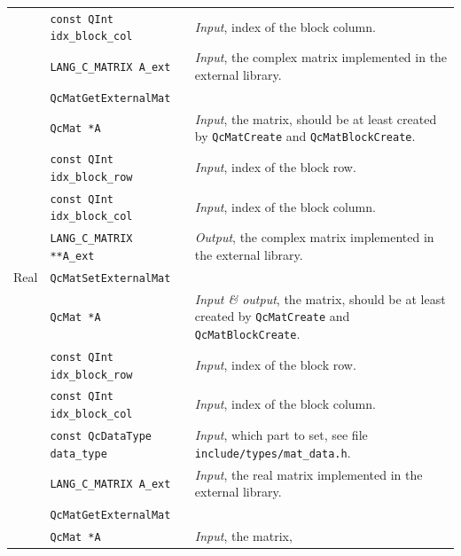 \documentclass[a4paper,11pt,twoside,openright]{book}
\begin{document}
\begin{center}
\begin{longtable}{p{}|l|p{}}
    & \hspace*{2ex}\verb|const QInt idx_block_col| & \textsl{Input},
      index of the block column.\\
    & \hspace*{2ex}\verb|LANG_C_MATRIX A_ext| & \textsl{Input}, the complex
      matrix implemented in the external library.\\
    \cline{2-3}
    & \verb|QcMatGetExternalMat| &\\
    & \hspace*{2ex}\verb|QcMat *A| & \textsl{Input}, the matrix,
      should be at least created by \verb|QcMatCreate| and \verb|QcMatBlockCreate|.\\
    & \hspace*{2ex}\verb|const QInt idx_block_row| & \textsl{Input},
      index of the block row.\\
    & \hspace*{2ex}\verb|const QInt idx_block_col| & \textsl{Input},
      index of the block column.\\
    & \hspace*{2ex}\verb|LANG_C_MATRIX **A_ext| & \textsl{Output}, the complex
      matrix implemented in the external library.\\
    \hline
    Real & \verb|QcMatSetExternalMat| &\\
    & \hspace*{2ex}\verb|QcMat *A| & \textsl{Input \& output}, the matrix,
      should be at least created by \verb|QcMatCreate| and \verb|QcMatBlockCreate|.\\
    & \hspace*{2ex}\verb|const QInt idx_block_row| & \textsl{Input},
      index of the block row.\\
    & \hspace*{2ex}\verb|const QInt idx_block_col| & \textsl{Input},
      index of the block column.\\
    & \hspace*{2ex}\verb|const QcDataType data_type| & \textsl{Input}, which part
      to set, see file \verb|include/types/mat_data.h|.\\
    & \hspace*{2ex}\verb|LANG_C_MATRIX A_ext| & \textsl{Input}, the real
      matrix implemented in the external library.\\
    \cline{2-3}
    & \verb|QcMatGetExternalMat| &\\
    & \hspace*{2ex}\verb|QcMat *A| & \textsl{Input}, the matrix,

\end{longtable}
\end{center}
\end{document}
